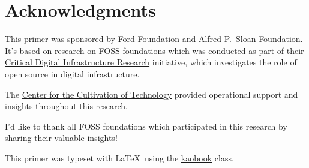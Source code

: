 


\chapter{Acknowledgments}

This primer was sponsored by \href{https://www.fordfoundation.org/}{Ford Foundation} and \href{https://sloan.org/}{Alfred P.\ Sloan Foundation}.  It's based on research on FOSS foundations which was conducted as part of their \href{https://www.fordfoundation.org/campaigns/critical-digital-infrastructure-research/}{Critical Digital Infrastructure Research} initiative, which investigates the role of open source in digital infrastructure.

The \href{https://techcultivation.org/}{Center for the Cultivation of Technology} provided operational support and insights throughout this research.

I'd like to thank all FOSS foundations which participated in this research by sharing their valuable insights!

This primer was typeset with \LaTeX\ using the \href{https://github.com/fmarotta/kaobook}{kaobook} class.

